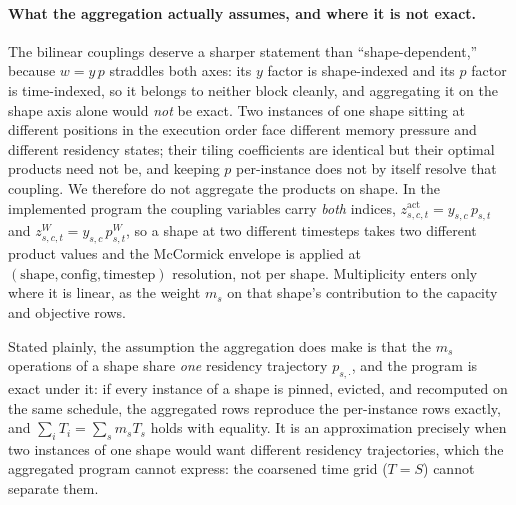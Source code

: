 \paragraph{What the aggregation actually assumes, and where it is not exact.}
\label{par:shape_agg_exactness}
The bilinear couplings deserve a sharper statement than ``shape-dependent,''
because $w=y\,p$ straddles both axes: its $y$ factor is shape-indexed and its
$p$ factor is time-indexed, so it belongs to neither block cleanly, and
aggregating it on the shape axis alone would \emph{not} be exact. Two instances
of one shape sitting at different positions in the execution order face
different memory pressure and different residency states; their tiling
coefficients are identical but their optimal products need not be, and keeping
$p$ per-instance does not by itself resolve that coupling. We therefore do not
aggregate the products on shape. In the implemented program the coupling
variables carry \emph{both} indices,
$z^{\mathrm{act}}_{s,c,t}=y_{s,c}\,p_{s,t}$ and
$z^{W}_{s,c,t}=y_{s,c}\,p^{W}_{s,t}$, so a shape at two different timesteps
takes two different product values and the McCormick envelope is applied at
$(\text{shape},\text{config},\text{timestep})$ resolution, not per shape.
Multiplicity enters only where it is linear, as the weight $m_s$ on that shape's
contribution to the capacity and objective rows.

Stated plainly, the assumption the aggregation does make is that the $m_s$
operations of a shape share \emph{one} residency trajectory $p_{s,\cdot}$, and
the program is exact under it: if every instance of a shape is pinned, evicted,
and recomputed on the same schedule, the aggregated rows reproduce the
per-instance rows exactly, and $\sum_i T_i = \sum_s m_s T_s$ holds with
equality. It is an approximation precisely when two instances of one shape
would want different residency trajectories, which the aggregated program
cannot express: the coarsened time grid ($T=S$) cannot separate them.

